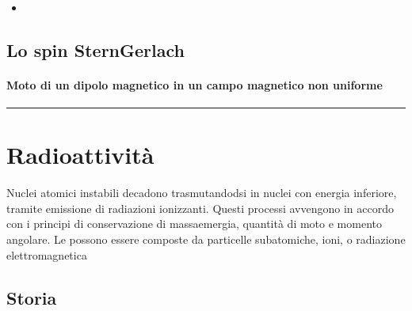 \documentclass[letterpaper,10pt,italian]{jupyterBook}
\begin{document}
\sphinxAtStartPar
{}
\begin{itemize}
\item {} 
\sphinxAtStartPar
{}

\end{itemize}


\section{Lo spin \sphinxhyphen{} Stern\sphinxhyphen{}Gerlach}
\label{\detokenize{ch/modern/experiments:lo-spin-stern-gerlach}}\label{\detokenize{ch/modern/experiments:modern-experiments-stern-gerlach}}\subsubsection*{Moto di un dipolo magnetico in un campo magnetico non uniforme}


\bigskip\hrule\bigskip


\sphinxstepscope


\chapter{Radioattività}
\label{\detokenize{ch/modern/intro-radioactivity:radioattivita}}\label{\detokenize{ch/modern/intro-radioactivity:physics-hs-modern-radioactivity}}\label{\detokenize{ch/modern/intro-radioactivity::doc}}
\sphinxAtStartPar
Nuclei atomici instabili decadono trasmutandodsi in nuclei con energia inferiore, tramite emissione di radiazioni ionizzanti.
Questi processi avvengono in accordo con i principi di conservazione di massa\sphinxhyphen{}emergia, quantità di moto e momento angolare.
Le possono essere composte da particelle subatomiche, ioni, o radiazione elettromagnetica  


\section{Storia}
\label{\detokenize{ch/modern/intro-radioactivity:storia}}
\end{document}
